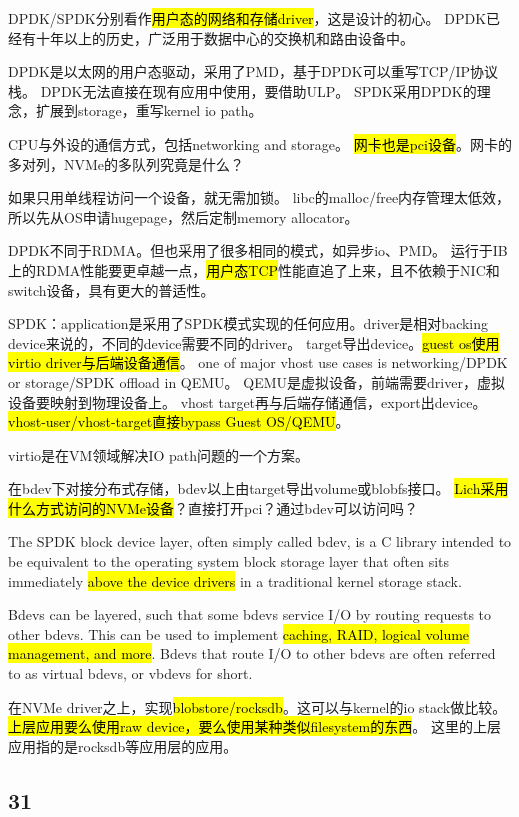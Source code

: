 DPDK/SPDK分别看作\hl{用户态的网络和存储driver}，这是设计的初心。
DPDK已经有十年以上的历史，广泛用于数据中心的交换机和路由设备中。

DPDK是以太网的用户态驱动，采用了PMD，基于DPDK可以重写TCP/IP协议栈。
DPDK无法直接在现有应用中使用，要借助ULP。
SPDK采用DPDK的理念，扩展到storage，重写kernel io path。

CPU与外设的通信方式，包括networking and storage。
\hl{网卡也是pci设备}。网卡的多对列，NVMe的多队列究竟是什么？

如果只用单线程访问一个设备，就无需加锁。
libc的malloc/free内存管理太低效，所以先从OS申请hugepage，然后定制memory allocator。

DPDK不同于RDMA。但也采用了很多相同的模式，如异步io、PMD。
运行于IB上的RDMA性能要更卓越一点，\hl{用户态TCP}性能直追了上来，且不依赖于NIC和switch设备，具有更大的普适性。

SPDK：application是采用了SPDK模式实现的任何应用。driver是相对backing device来说的，不同的device需要不同的driver。
target导出device。\hl{guest os使用virtio driver与后端设备通信}。
one of major vhost use cases is networking/DPDK or storage/SPDK offload in QEMU。
QEMU是虚拟设备，前端需要driver，虚拟设备要映射到物理设备上。
vhost target再与后端存储通信，export出device。
\hl{vhost-user/vhost-target直接bypass Guest OS/QEMU}。

virtio是在VM领域解决IO path问题的一个方案。

\hrulefill

在bdev下对接分布式存储，bdev以上由target导出volume或blobfs接口。
\hl{Lich采用什么方式访问的NVMe设备}？直接打开pci？通过bdev可以访问吗？

The SPDK block device layer, often simply called bdev, is a C library intended to be equivalent to the operating system block storage layer
that often sits immediately \hl{above the device drivers} in a traditional kernel storage stack.

Bdevs can be layered, such that some bdevs service I/O by routing requests to other bdevs.
This can be used to implement \hl{caching, RAID, logical volume management, and more}.
Bdevs that route I/O to other bdevs are often referred to as virtual bdevs, or vbdevs for short.

在NVMe driver之上，实现\hl{blobstore/rocksdb}。这可以与kernel的io stack做比较。
\hl{上层应用要么使用raw device，要么使用某种类似filesystem的东西}。
这里的上层应用指的是rocksdb等应用层的应用。

\subsection{31}

